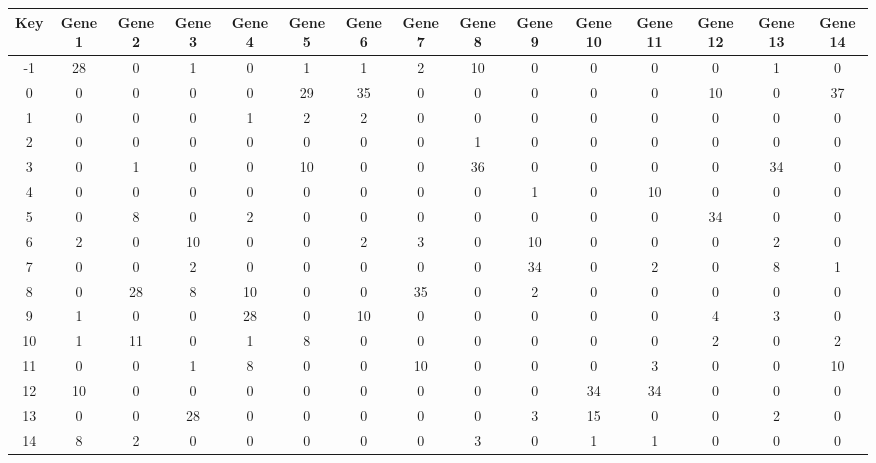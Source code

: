 \begin{tabular}{|c|c|c|c|c|c|c|c|c|c|c|c|c|c|c|}
\hline
Key & Gene 1 & Gene 2 & Gene 3 & Gene 4 & Gene 5 & Gene 6 & Gene 7 & Gene 8 & Gene 9 & Gene 10 & Gene 11 & Gene 12 & Gene 13 & Gene 14 \\
\hline
-1 & 28 & 0 & 1 & 0 & 1 & 1 & 2 & 10 & 0 & 0 & 0 & 0 & 1 & 0 \\
0 & 0 & 0 & 0 & 0 & 29 & 35 & 0 & 0 & 0 & 0 & 0 & 10 & 0 & 37 \\
1 & 0 & 0 & 0 & 1 & 2 & 2 & 0 & 0 & 0 & 0 & 0 & 0 & 0 & 0 \\
2 & 0 & 0 & 0 & 0 & 0 & 0 & 0 & 1 & 0 & 0 & 0 & 0 & 0 & 0 \\
3 & 0 & 1 & 0 & 0 & 10 & 0 & 0 & 36 & 0 & 0 & 0 & 0 & 34 & 0 \\
4 & 0 & 0 & 0 & 0 & 0 & 0 & 0 & 0 & 1 & 0 & 10 & 0 & 0 & 0 \\
5 & 0 & 8 & 0 & 2 & 0 & 0 & 0 & 0 & 0 & 0 & 0 & 34 & 0 & 0 \\
6 & 2 & 0 & 10 & 0 & 0 & 2 & 3 & 0 & 10 & 0 & 0 & 0 & 2 & 0 \\
7 & 0 & 0 & 2 & 0 & 0 & 0 & 0 & 0 & 34 & 0 & 2 & 0 & 8 & 1 \\
8 & 0 & 28 & 8 & 10 & 0 & 0 & 35 & 0 & 2 & 0 & 0 & 0 & 0 & 0 \\
9 & 1 & 0 & 0 & 28 & 0 & 10 & 0 & 0 & 0 & 0 & 0 & 4 & 3 & 0 \\
10 & 1 & 11 & 0 & 1 & 8 & 0 & 0 & 0 & 0 & 0 & 0 & 2 & 0 & 2 \\
11 & 0 & 0 & 1 & 8 & 0 & 0 & 10 & 0 & 0 & 0 & 3 & 0 & 0 & 10 \\
12 & 10 & 0 & 0 & 0 & 0 & 0 & 0 & 0 & 0 & 34 & 34 & 0 & 0 & 0 \\
13 & 0 & 0 & 28 & 0 & 0 & 0 & 0 & 0 & 3 & 15 & 0 & 0 & 2 & 0 \\
14 & 8 & 2 & 0 & 0 & 0 & 0 & 0 & 3 & 0 & 1 & 1 & 0 & 0 & 0 \\
\hline
\end{tabular}